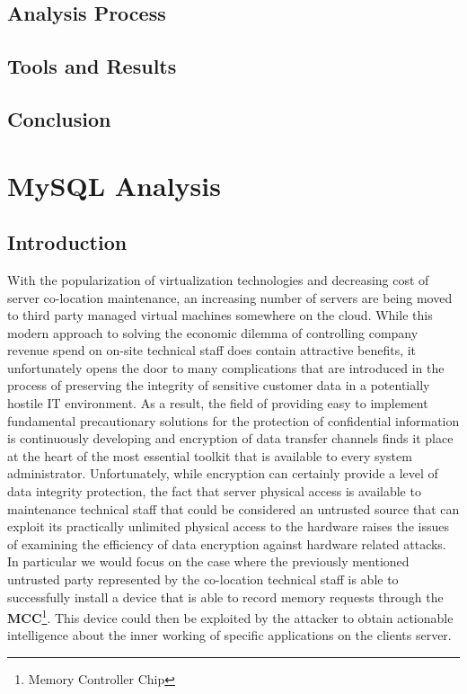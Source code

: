 \documentclass[11pt,a4paper, titlepage, oneside]{article}
\begin{document}
\subsection{Analysis Process}
\subsection{Tools and Results}
\subsection{Conclusion}
\section{MySQL Analysis}
\subsection{Introduction}
With the popularization of virtualization technologies and decreasing cost of server co-location maintenance, an increasing number of servers are being moved to third party managed virtual machines somewhere on the cloud. While this modern approach to solving the economic dilemma of controlling company revenue spend    on on-site technical staff does contain attractive benefits, it unfortunately opens the door to many complications that are introduced in the process of preserving the integrity of sensitive customer data in a potentially hostile IT environment. As a result, the field of providing easy to implement fundamental precautionary solutions for the protection of confidential information is continuously developing and encryption of data transfer channels finds it place at the heart of the most essential toolkit that is available to every system administrator. Unfortunately, while encryption can certainly provide a level of data integrity protection, the fact that server physical access is available to maintenance technical staff that could be considered an untrusted source that can exploit its practically unlimited physical access to the hardware raises the issues of examining the efficiency of data encryption against hardware related attacks. In particular we would focus on the case where the previously mentioned untrusted party represented by the co-location technical staff is able to successfully install a device that is able to record memory requests through the \textbf{MCC}\footnote[0]{Memory Controller Chip}. This device could then be exploited by the attacker to obtain actionable intelligence about the inner working of specific applications on the clients server.
\end{document}
